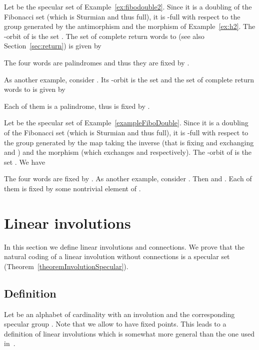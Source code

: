 \documentclass[preprint,12pt]{elsarticle}
\numberwithin{theorem}{section}
\numberwithin{equation}{section}
\numberwithin{figure}{section}
\numberwithin{table}{section}
\begin{document}
\begin{example}
\label{ex:fibodoubleh2}
Let  be the specular set of Example~\ref{ex:fibodouble2}.
Since it is a doubling of the Fibonacci set (which is Sturmian and thus full), it is -full with respect to the group  generated by the antimorphism  and the morphism  of Example~\ref{ex:h2}.
The -orbit of  is the set .
The set of complete return words to  (see also Section~\ref{sec:return}) is given by

The four words are palindromes and thus they are fixed by .

As another example, consider .
Its -orbit is the set  and the set of complete return words to  is given by

Each of them is a palindrome, thus is fixed by .
\end{example}

\begin{example}
Let  be the specular set of Example~\ref{exampleFiboDouble}.
Since it is  a doubling of the Fibonacci set (which is Sturmian and thus full), it is -full with respect to the group  generated by the map  taking the inverse (that is fixing  and exchanging  and ) and the morphism  (which exchanges  and  respectively).
The -orbit of  is the set .
We have

The four words are fixed by .
 As another example, consider . Then
 and .
Each of them is fixed by some nontrivial element of .
\end{example}










\section{Linear involutions}
\label{sectionInvolutions}
In this section we define linear involutions and connections.
We prove that the natural coding of a linear involution without connections is a specular set (Theorem~\ref{theoremInvolutionSpecular}).





\subsection{Definition}
Let  be an alphabet of cardinality  with an involution  and the corresponding specular group . 
Note that we allow
 to have fixed points. 
This leads to a definition of linear involutions which is somewhat more general than the one used in~\cite{DanthonyNogueira1988,BertheDelecroixDolcePerrinReutenauerRindone2014}.
\end{document}
